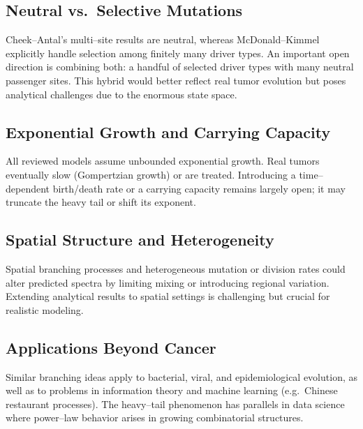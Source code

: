 \documentclass[11pt]{article}
\begin{document}
\subsection{Neutral vs.~Selective Mutations}
Cheek--Antal’s multi--site results are neutral, whereas McDonald--Kimmel explicitly handle selection among finitely many driver types. An important open direction is combining both: a handful of selected driver types with many neutral passenger sites. This hybrid would better reflect real tumor evolution but poses analytical challenges due to the enormous state space.

\subsection{Exponential Growth and Carrying Capacity}
All reviewed models assume unbounded exponential growth. Real tumors eventually slow (Gompertzian growth) or are treated. Introducing a time--dependent birth/death rate or a carrying capacity remains largely open; it may truncate the heavy tail or shift its exponent.

\subsection{Spatial Structure and Heterogeneity}
Spatial branching processes and heterogeneous mutation or division rates could alter predicted spectra by limiting mixing or introducing regional variation. Extending analytical results to spatial settings is challenging but crucial for realistic modeling.

\subsection{Applications Beyond Cancer}
Similar branching ideas apply to bacterial, viral, and epidemiological evolution, as well as to problems in information theory and machine learning (e.g.~Chinese restaurant processes). The heavy--tail phenomenon has parallels in data science where power--law behavior arises in growing combinatorial structures.
\end{document}
